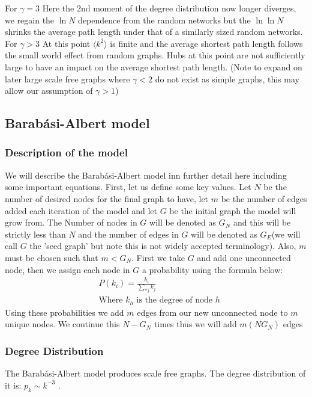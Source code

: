 \documentclass{article}
\begin{document}
            For $\gamma =3$ Here the 2nd moment of the degree distribution now longer diverges, we regain the $\ln N$ dependence from the random networks but the $\ln\ln N$ shrinks the average path length under that of a similarly sized random networks.\\
            For $\gamma > 3$ At this point $\langle k^2 \rangle$ is finite and the average shortest path length follows the small world effect from random graphs. Hubs at this point are not sufficiently large to have an impact on the average shortest path length.
            (Note to expand on later large scale free graphs where $\gamma < 2$ do not exist as simple graphs, this may allow our assumption of $\gamma >1$)
        \subsection{Barabási-Albert model}
            \subsubsection{Description of the model}
            We will describe the Barabási-Albert model inn further detail here including some important equations. First, let us define some key values. Let $N$ be the number of desired nodes for the final graph to have, let $m$ be the number of edges added each iteration of the model and let $G$ be the initial graph the model will grow from. The Number of nodes in $G$ will be denoted as $G_N$ and this will be strictly less than $N$ and the number of edges in $G$ will be denoted as $G_E$(we will call $G$ the 'seed graph' but note this is not widely accepted terminology). Also, $m$ must be chosen such that $m < G_N$. First we take $G$ and add one unconnected node, then we assign each node in $G$ a probability using the formula below:
            \begin{align*}
                &P(k_i)=\frac{k_i}{\sum_{\forall j}k_j}\\
                &\text{Where $k_h$ is the degree of node $h$}
            \end{align*}
            Using these probabilities we add $m$ edges from our new unconnected node to $m$ unique nodes. We continue this $N-G_N$ times thus we will add $m(NG_{N})$ edges
            \subsubsection{Degree Distribution}
            The Barabási-Albert model produces scale free graphs. The degree distribution of it is: $p_{k} \sim k^{-3}$ \parencite{barabasi2013network}.
\end{document}
